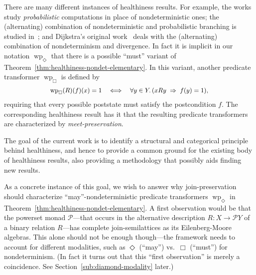 \documentclass[9pt, preprint]{sigplanconf}
\theoremstyle{theorem}
\theoremstyle{definition}
\newcommand{\pow}{\mathcal{P}}
\newcommand{\wpre}{\mathop{\mathrm{wp}}\nolimits}
\begin{document}
There are many different instances of healthiness results.  For example,
the works~\cite{Kozen81,Jones90PhD} study \emph{probabilistic}
computations in place of nondeterministic ones; the (alternating)
combination of nondeterministic and probabilistic branching is studied
in~\cite{MorganMS96}; and Dijkstra's original work~\cite{Dijkstra76}
deals with the (alternating) combination of nondeterminism and
divergence. In fact it is implicit in our notation $\wpre_{\Diamond}$
that there is a possible ``must'' variant of
Theorem~\ref{thm:healthiness-nondet-elementary}. In this
variant, another  predicate transformer $\wpre_{\Box}$ is defined by
\begin{equation}\label{eq:boxPredTransfConcretely}
\small\begin{array}{l}
  	 \wpre_{\Box}(R)(f)(x)=1
	 \quad\Longleftrightarrow\quad
	 \forall y\in Y.\, (xRy\;\Rightarrow\;f(y)=1),
\end{array}
\end{equation}
requiring that every possible poststate must satisfy the postcondition
$f$.  The corresponding healthiness result has it that the resulting predicate
transformers are characterized by \emph{meet-preservation}.


The goal of the current work is to identify a structural and categorical
principle behind  healthiness, and hence to provide a common
ground for the  existing body of healthiness results, also providing a methodology that possibly aids finding
new  results.

 As a concrete instance of this goal, we wish to answer why
join-preservation should characterize ``may''-nondeterministic predicate
transformers $\wpre_{\Diamond}$ in
Theorem~\ref{thm:healthiness-nondet-elementary}. A first observation
would be that the powerset monad $\pow$---that occurs in the alternative
description $R\colon X\to \pow Y$ of a binary relation $R$---has
complete join-semilattices as its Eilenberg-Moore algebras.  This alone
should not be enough though---the framework needs to account for
different modalities, such as $\Diamond$ (``may'') vs.\ $\Box$
(``must'') for nondeterminism. (In fact it turns out that this ``first
observation'' is merely a coincidence. See
Section~\ref{sub:diamond-modality} later.)
\end{document}
